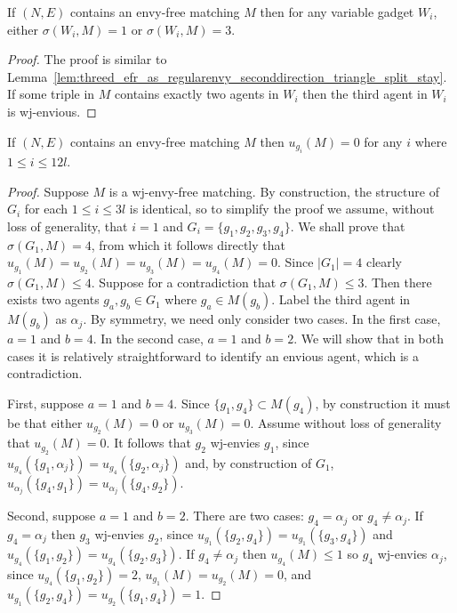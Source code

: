 \begin{lem}
\label{lem:threed_efr_as_wjenvy_seconddirection_triangle_split_stay}
If $(N, E)$ contains an envy-free matching $M$ then for any variable gadget $W_i$, either $\sigma(W_i, M)=1$ or $\sigma(W_i, M)=3$.
\end{lem}
\begin{proof}
The proof is similar to Lemma~\ref{lem:threed_efr_as_regularenvy_seconddirection_triangle_split_stay}. If some triple in $M$ contains exactly two agents in $W_i$ then the third agent in $W_i$ is wj-envious.
\end{proof}

\begin{lem}
\label{lem:threed_efr_as_wjenvy_giscores0}
If $(N, E)$ contains an envy-free matching $M$ then $u_{g_i}(M)=0$ for any $i$ where $1\leq i\leq 12l$.
\end{lem}
\begin{proof}
Suppose $M$ is a wj-envy-free matching. By construction, the structure of $G_i$ for each $1\leq i\leq 3l$ is identical, so to simplify the proof we assume, without loss of generality, that $i=1$ and $G_i=\{ g_1, g_2, g_3, g_4 \}$. We shall prove that $\sigma(G_1, M)=4$, from which it follows directly that $u_{g_1}(M)=u_{g_2}(M)=u_{g_3}(M)=u_{g_4}(M)=0$. Since $|G_1|=4$ clearly $\sigma(G_1, M) \leq 4$. Suppose for a contradiction that $\sigma(G_1, M) \leq 3$. Then there exists two agents $g_a, g_b \in G_1$ where $g_a \in M(g_b)$. Label the third agent in $M(g_b)$ as $\alpha_j$. By symmetry, we need only consider two cases. In the first case, $a=1$ and $b=4$. In the second case, $a=1$ and $b=2$. We will show that in both cases it is relatively straightforward to identify an envious agent, which is a contradiction.

First, suppose $a=1$ and $b=4$. Since $\{ g_1, g_4 \} \subset M(g_4)$, by construction it must be that either $u_{g_2}(M)=0$ or $u_{g_3}(M)=0$. Assume without loss of generality that $u_{g_2}(M)=0$. It follows that $g_2$ wj-envies $g_1$, since $u_{g_4}(\{ g_1, \alpha_j \}) = u_{g_4}(\{ g_2, \alpha_j \})$ and, by construction of $G_1$, $u_{\alpha_j}(\{ g_4, g_1 \}) = u_{\alpha_j}(\{ g_4, g_2 \})$. 

Second, suppose $a=1$ and $b=2$. There are two cases: $g_4=\alpha_j$ or $g_4\neq \alpha_j$. If $g_4=\alpha_j$ then $g_3$ wj-envies $g_2$, since $u_{g_1}(\{ g_2, g_4 \}) = u_{g_1}(\{ g_3, g_4 \})$ and $u_{g_4}(\{ g_1, g_2 \}) = u_{g_4}(\{ g_2, g_3 \})$. If $g_4\neq \alpha_j$ then $u_{g_4}(M)\leq 1$ so $g_4$ wj-envies $\alpha_j$, since $u_{g_4}(\{ g_1, g_2 \})=2$, $u_{g_1}(M)=u_{g_2}(M)=0$, and $u_{g_1}(\{ g_2, g_4 \})=u_{g_2}(\{ g_1, g_4 \})=1$.
\end{proof}

